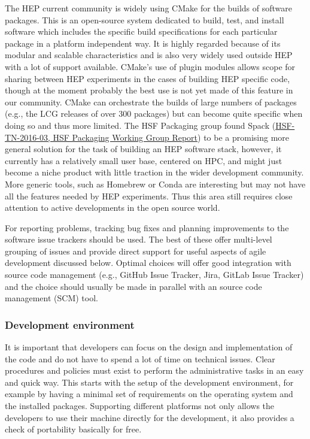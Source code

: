 \documentclass[12pt,a4paper]{article}
\begin{document}
The HEP current community is widely using CMake for the builds of
software packages. This is an open-source system dedicated to build,
test, and install software which includes the specific build
specifications for each particular package in a platform independent
way. It is highly regarded because of its modular and scalable
characteristics and is also very widely used outside HEP with a lot of
support available. CMake's use of plugin modules allows scope for
sharing between HEP experiments in the cases of building HEP specific
code, though at the moment probably the best use is not yet made of this
feature in our community. CMake can orchestrate the builds of large
numbers of packages (e.g., the LCG releases of over 300 packages) but
can become quite specific when doing so and thus more limited. The HSF
Packaging group found Spack
(\href{http://hepsoftwarefoundation.org/notes/HSF-TN-2016-03.pdf}{{HSF-TN-2016-03,
HSF Packaging Working Group Report}}) to be a promising more general
solution for the task of building an HEP software stack, however, it
currently has a relatively small user base, centered on HPC, and might
just become a niche product with little traction in the wider
development community. More generic tools, such as Homebrew or Conda are
interesting but may not have all the features needed by HEP experiments.
Thus this area still requires close attention to active developments in
the open source world.

For reporting problems, tracking bug fixes and planning improvements to
the software issue trackers should be used. The best of these offer
multi-level grouping of issues and provide direct support for useful
aspects of agile development discussed below. Optimal choices will offer
good integration with source code management (e.g., GitHub Issue
Tracker, Jira, GitLab Issue Tracker) and the choice should usually be
made in parallel with an source code management (SCM) tool.

\hypertarget{development-environment}{%
\subsubsection{Development environment}\label{development-environment}}

It is important that developers can focus on the design and
implementation of the code and do not have to spend a lot of time on
technical issues. Clear procedures and policies must exist to perform
the administrative tasks in an easy and quick way. This starts with the
setup of the development environment, for example by having a minimal
set of requirements on the operating system and the installed packages.
Supporting different platforms not only allows the developers to use
their machine directly for the development, it also provides a check of
portability basically for free.
\end{document}
